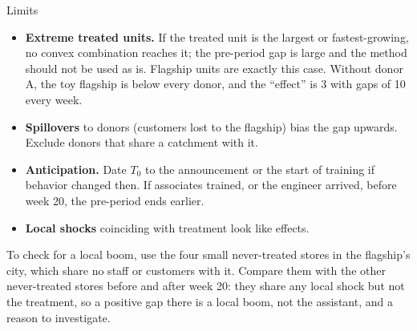 \documentclass[aspectratio=169, 11pt, handout]{beamer}
\begin{document}
\begin{frame}{Limits}

\begin{itemize}
  \item \textbf{Extreme treated units.} If the treated unit is the largest or fastest-growing, no convex combination reaches it; the pre-period gap is large and the method should not be used as is. Flagship units are exactly this case. Without donor A, the toy flagship is below every donor, and the ``effect'' is 3 with gaps of 10 every week.
  \item \textbf{Spillovers} to donors (customers lost to the flagship) bias the gap upwards. Exclude donors that share a catchment with it.
  \item \textbf{Anticipation.} Date $T_0$ to the announcement or the start of training if behavior changed then. If associates trained, or the engineer arrived, before week 20, the pre-period ends earlier.
  \item \textbf{Local shocks} coinciding with treatment look like effects.
\end{itemize}

\medskip

To check for a local boom, use the four small never-treated stores in the flagship's city, which share no staff or customers with it. Compare them with the other never-treated stores before and after week 20: they share any local shock but not the treatment, so a positive gap there is a local boom, not the assistant, and a reason to investigate.
\end{frame}
\end{document}
